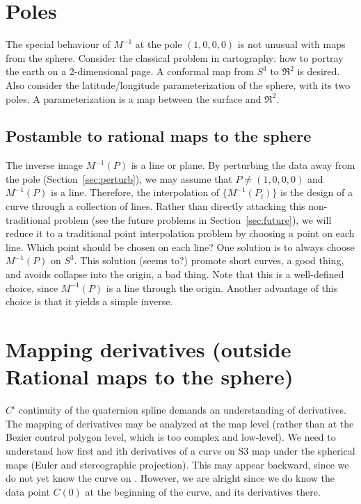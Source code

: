 \documentclass[12pt]{article}
\newif\ifRationalMap
\begin{document}
\clearpage

\section{Poles}

The special behaviour of $M^{-1}$ at the pole $(1,0,0,0)$
is not unusual with maps from the sphere.
Consider the classical problem in cartography: how to portray the earth
on a 2-dimensional page.
A conformal map from $S^3$ to $\Re^2$ is desired.
Also consider the latitude/longitude parameterization of the sphere, with its two poles.
A parameterization is a map between the surface and $\Re^2$.

\clearpage

\subsection{Postamble to rational maps to the sphere}

The inverse image $M^{-1}(P)$ is a line or plane.
By perturbing the data away from the pole (Section~\ref{sec:perturb}), 
we may assume that $P \neq (1,0,0,0)$ and $M^{-1}(P)$ is a line.
Therefore, the interpolation of $\{M^{-1}(P_i)\}$ is the design of a curve through a
collection of lines.
Rather than directly attacking this non-traditional problem (see the future problems in
Section~\ref{sec:future}), we will reduce it to a traditional point
interpolation problem by choosing a point on each line.
Which point should be chosen on each line?
One solution is to always choose $M^{-1}(P)$ on $S^3$.
This solution (seems to?) promote short curves, a good thing, 
and avoids collapse into the origin, a bad thing.
Note that this is a well-defined choice, since $M^{-1}(P)$ is a line through the origin.
Another advantage of this choice is that it yields a simple inverse.
\fi %

\clearpage

\section{Mapping derivatives (outside Rational maps to the sphere)}

$C^i$ continuity of the quaternion spline demands an understanding of derivatives.
The mapping of derivatives may be analyzed at the map level 
(rather than at the Bezier control polygon level, which is too complex and low-level).
We need to understand how first and ith derivatives of a curve on S3 map under 
the spherical maps (Euler and stereographic projection).
This may appear backward, since we do not yet know the curve on .
However, we are alright since we do know the data point $C(0)$ at the beginning
of the curve, and its derivatives there.
\end{document}
